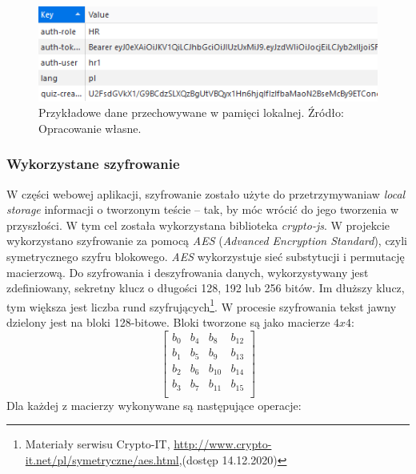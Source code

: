 \documentclass[twoside]{projektInzynierskiMS}
\numberwithin{figure}{section}
\begin{document}
\begin{figure}[h!]
    \centering
    \includegraphics[scale=0.9]{images/token.png}
    \caption{Przykładowe dane przechowywane w pamięci lokalnej. Źródło: Opracowanie własne.}
    \label{fig:token}
\end{figure}

\subsubsection{Wykorzystane szyfrowanie}
W części webowej aplikacji, szyfrowanie zostało użyte do przetrzymywania\linebreak w \textit{local storage} informacji o tworzonym teście -- tak, by móc wrócić do jego tworzenia w przyszłości. W tym cel została wykorzystana biblioteka \textit{crypto-js}. W projekcie wykorzystano szyfrowanie za pomocą \textit{AES} (\textit{Advanced Encryption Standard}), czyli symetrycznego szyfru blokowego. \textit{AES} wykorzystuje sieć substytucji i permutację macierzową. Do szyfrowania i deszyfrowania danych, wykorzystywany jest zdefiniowany, sekretny klucz o długości 128, 192 lub 256 bitów. Im dłuższy klucz, tym większa jest liczba rund szyfrujących\footnote{Materiały serwisu Crypto-IT, \url{http://www.crypto-it.net/pl/symetryczne/aes.html},\newline (dostęp 14.12.2020)}. \newline
W procesie szyfrowania tekst jawny dzielony jest na bloki 128-bitowe. Bloki tworzone są jako macierze $4x4$:
$$\left[\begin{array}{cccc}
b_{0}&b_{4}&b_{8}&b_{12}\\
b_{1}&b_{5}&b_{9}&b_{13}\\
b_{2}&b_{6}&b_{10}&b_{14}\\
b_{3}&b_{7}&b_{11}&b_{15}\\
\end{array}\right]$$
Dla każdej z macierzy wykonywane są następujące operacje:
\end{document}
